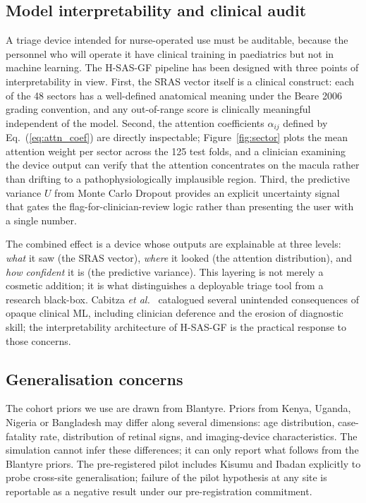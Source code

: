 \documentclass[twocolumn,10pt]{article}
\begin{document}
\subsection{Model interpretability and clinical audit}
\label{sec:interpret}
A triage device intended for nurse-operated use must be
auditable, because the personnel who will operate it have
clinical training in paediatrics but not in machine learning.
The H-SAS-GF pipeline has been designed with three points of
interpretability in view. First, the SRAS vector itself is a
clinical construct: each of the 48 sectors has a well-defined
anatomical meaning under the Beare 2006 grading convention,
and any out-of-range score is clinically meaningful independent
of the model. Second, the attention coefficients $\alpha_{ij}$
defined by Eq.~(\ref{eq:attn_coef}) are directly inspectable;
Figure~\ref{fig:sector} plots the mean attention weight per
sector across the 125 test folds, and a clinician examining the
device output can verify that the attention concentrates on
the macula rather than drifting to a pathophysiologically
implausible region. Third, the predictive variance $U$ from
Monte Carlo Dropout provides an explicit uncertainty signal
that gates the flag-for-clinician-review logic rather than
presenting the user with a single number.

The combined effect is a device whose outputs are explainable
at three levels: \emph{what} it saw (the SRAS vector),
\emph{where} it looked (the attention distribution), and
\emph{how confident} it is (the predictive variance). This
layering is not merely a cosmetic addition; it is what
distinguishes a deployable triage tool from a research
black-box. Cabitza \emph{et al.}\ \cite{CabitzaRasoini2017}
catalogued several unintended consequences of opaque clinical
ML, including clinician deference and the erosion of
diagnostic skill; the interpretability architecture of
H-SAS-GF is the practical response to those concerns.

\subsection{Generalisation concerns}
The cohort priors we use are drawn from Blantyre. Priors from
Kenya, Uganda, Nigeria or Bangladesh may differ along several
dimensions: age distribution, case-fatality rate, distribution of
retinal signs, and imaging-device characteristics. The simulation
cannot infer these differences; it can only report what follows
from the Blantyre priors. The pre-registered pilot includes
Kisumu and Ibadan explicitly to probe cross-site generalisation;
failure of the pilot hypothesis at any site is reportable as a
negative result under our pre-registration commitment.
\end{document}
